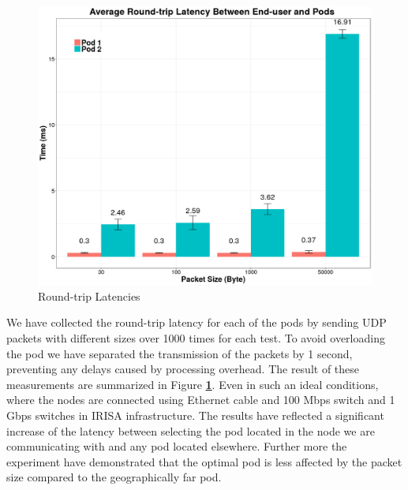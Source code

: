 \documentclass[letterpaper,twocolumn,10pt]{article}
\let\origref\ref
\def\ref#1{\textbf{\origref{#1}}}
\begin{document}
\begin{figure}[tbp]
  \centering
  \includegraphics[width=.9\linewidth]{images/graph.png}
  \caption{Round-trip Latencies}
  \label{fig:lat}
\end{figure}

%
% 

We have collected the round-trip latency for each of the pods by sending UDP packets with different sizes over 1000 times for each test. To avoid overloading the pod we have separated the transmission of the packets by 1 second, preventing any delays caused by processing overhead. The result of these measurements are summarized in Figure \ref{fig:lat}. Even in such an ideal conditions, where the nodes are connected using Ethernet cable and 100 Mbps switch and 1 Gbps switches in IRISA infrastructure. The results have reflected a significant increase of the latency between selecting the pod located in the node we are communicating with and any pod located elsewhere. Further more the experiment have demonstrated that the optimal pod is less affected by the packet size compared to the geographically far pod. 
\end{document}
